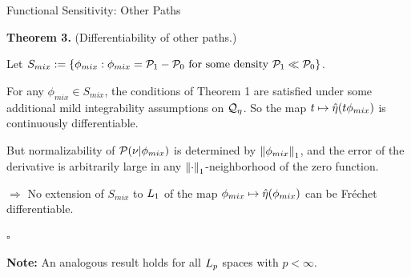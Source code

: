 \begin{frame}{Functional Sensitivity: Other Paths}






\pause

\textbf{Theorem 3.} (Differentiability of other paths.)

\pause 

Let
$S_{mix} := \{\phi_{mix}: \phi_{mix} =
 \mathcal{P}_{1} - \mathcal{P}_{0} \textrm{ for some density }
 \mathcal{P}_{1} \ll \mathcal{P}_{0} \}$.

\pause 

For any $\phi_{mix} \in S_{mix}$, the conditions of 
Theorem 1 are satisfied under some additional mild integrability
assumptions on $\mathcal{Q}_\eta$.  So the map $t \mapsto \hat\eta(t \phi_{mix})$
is continuously differentiable.

\pause

But normalizability of $\mathcal{P}(\nu \vert \phi_{mix})$ is determined by
$\left\Vert\phi_{mix}\right\Vert_1$, and the error of the derivative is
arbitrarily large in any $\left\Vert\cdot\right\Vert_1$-neighborhood of the zero function.

\pause

$\Rightarrow$ No extension
of $S_{mix}$ to ${L_{1}}$ of the map $\phi_{mix} \mapsto \hat\eta(\phi_{mix})$ 
can be Fr{\'e}chet differentiable. 



\hfill $\square$

\pause

\textbf{Note:}
An analogous result holds for all ${L_{p}}$ spaces with $p < \infty$.

\end{frame}






